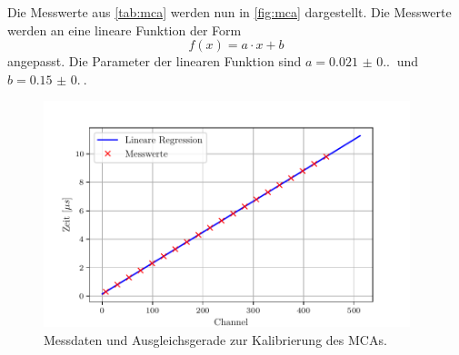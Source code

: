 Die Messwerte aus \autoref{tab:mca} werden nun in \autoref{fig:mca} dargestellt. Die Messwerte werden an eine lineare Funktion der Form
\begin{equation*}
  f(x) = a \cdot x + b
\end{equation*}
angepasst. Die Parameter der linearen Funktion sind $a = \SI{0.021(0.00)}{}$ und $b = \SI{0.15(0.00)}{}$.

\begin{figure}[H]
  \centering
  \includegraphics[width=0.95\textwidth]{build/mca.pdf}
  \caption{Messdaten und Ausgleichsgerade zur Kalibrierung des MCAs.}
  \label{fig:mca}
\end{figure}



\newpage